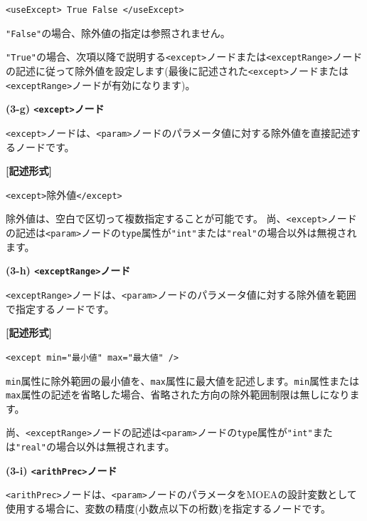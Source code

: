 \documentclass[a4paper,11pt]{jarticle}
\begin{document}
{\leftskip=42pt
\texttt{<useExcept> True \textbar{} False </useExcept>}

\vspace{8pt}
\leftskip=0pt
\texttt{"False"}の場合、除外値の指定は参照されません。

\texttt{"True"}の場合、次項以降で説明する\texttt{<except>}ノードまたは\texttt{<exceptRange>}ノードの記述に従って除外値を設定します(最後に記述された\texttt{<except>}ノードまたは\texttt{<exceptRange>}ノードが有効になります)。

\vspace{12pt}
\textbf{(3-g) \texttt{<except>}ノード}

\texttt{<except>}ノードは、\texttt{<param>}ノードのパラメータ値に対する除外値を直接記述するノードです。

\vspace{8pt}
\leftskip=12pt
\textbf{[記述形式]}

\leftskip=42pt
\texttt{<except>}除外値\texttt{</except>}

\vspace{8pt}
\leftskip=0pt
除外値は、空白で区切って複数指定することが可能です。
尚、\texttt{<except>}ノードの記述は\texttt{<param>}ノードの{\tt type}属性が\texttt{"int"}または\texttt{"real"}の場合以外は無視されます。

\vspace{12pt}
\textbf{(3-h) \texttt{<exceptRange>}ノード}

\texttt{<exceptRange>}ノードは、\texttt{<param>}ノードのパラメータ値に対する除外値を範囲で指定するノードです。

\vspace{8pt}
\leftskip=12pt
\textbf{[記述形式]}

\leftskip=42pt
\texttt{<except  min="最小値"  max="最大値" />}

\vspace{8pt}
\leftskip=0pt
{\tt min}属性に除外範囲の最小値を、{\tt max}属性に最大値を記述します。{\tt min}属性または{\tt max}属性の記述を省略した場合、省略された方向の除外範囲制限は無しになります。

尚、\texttt{<exceptRange>}ノードの記述は\texttt{<param>}ノードの{\tt type}属性が\texttt{"int"}または\texttt{"real"}の場合以外は無視されます。

\vspace{12pt}
\textbf{(3-i) \texttt{<arithPrec>}ノード}

\texttt{<arithPrec>}ノードは、\texttt{<param>}ノードのパラメータをMOEAの設計変数として使用する場合に、変数の精度(小数点以下の桁数)を指定するノードです。

}
\end{document}
